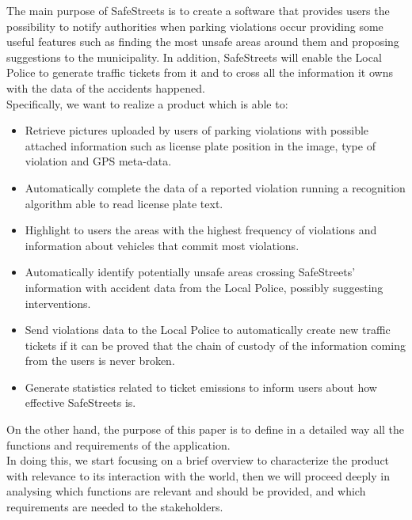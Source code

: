 The main purpose of SafeStreets is to create a software that provides users the possibility to notify	
authorities	when parking violations occur providing some useful features such as finding the most unsafe areas around them and proposing suggestions to the municipality. In addition, SafeStreets will enable the Local Police to generate traffic tickets from it and to cross all the information it owns with the data of the accidents happened.\\
Specifically, we want to realize a product which is able to:
\begin{itemize}
	
	\item Retrieve pictures uploaded by users of parking violations with possible attached information such as license plate position in the image, type of violation and GPS meta-data.
	
	\item Automatically complete the data of a reported violation running a recognition algorithm able to read license plate text.
	
	\item Highlight to users the areas with the highest frequency of violations and information about vehicles that commit most violations.
	
	\item Automatically identify potentially unsafe	areas crossing SafeStreets' information with accident data from the Local Police, possibly suggesting interventions.
	
	\item Send violations data to the Local Police to automatically create new traffic tickets if it can be proved that the	chain	of	custody	of	the	information	coming	from	the	users	is	never	broken.
	
	\item Generate statistics related to ticket emissions to inform users about how effective SafeStreets is.
	
\end{itemize}

On the other hand, the purpose of this paper is to define in a detailed way all the functions and requirements of the application.\\ In doing this, we start focusing on a brief overview to characterize the product with relevance to its interaction with the world, then we will proceed deeply in analysing which functions are relevant and should be provided, and which requirements are needed to the stakeholders. 
